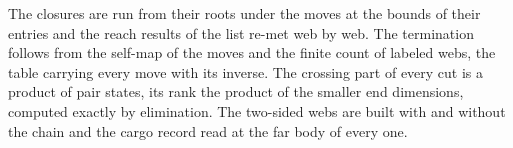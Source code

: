 The closures are run from their roots under the moves at the bounds of their entries and the reach results of the list re-met web by web. The termination follows from the self-map of the moves and the finite count of labeled webs, the table carrying every move with its inverse. The crossing part of every cut is a product of pair states, its rank the product of the smaller end dimensions, computed exactly by elimination. The two-sided webs are built with and without the chain and the cargo record read at the far body of every one.

